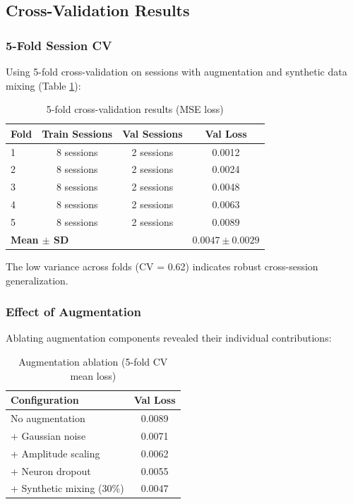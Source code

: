\documentclass[11pt,twocolumn]{article}
\begin{document}
\subsection{Cross-Validation Results}

\subsubsection{5-Fold Session CV}
Using 5-fold cross-validation on sessions with augmentation and synthetic data mixing (Table \ref{tab:cv_results}):

\begin{table}[htbp]
\centering
\caption{5-fold cross-validation results (MSE loss)}
\label{tab:cv_results}
\begin{tabular}{lccc}
\toprule
\textbf{Fold} & \textbf{Train Sessions} & \textbf{Val Sessions} & \textbf{Val Loss} \\
\midrule
1 & 8 sessions & 2 sessions & 0.0012 \\
2 & 8 sessions & 2 sessions & 0.0024 \\
3 & 8 sessions & 2 sessions & 0.0048 \\
4 & 8 sessions & 2 sessions & 0.0063 \\
5 & 8 sessions & 2 sessions & 0.0089 \\
\midrule
\multicolumn{3}{l}{\textbf{Mean $\pm$ SD}} & $\mathbf{0.0047 \pm 0.0029}$ \\
\bottomrule
\end{tabular}
\end{table}

The low variance across folds (CV = 0.62) indicates robust cross-session generalization.

\subsubsection{Effect of Augmentation}
Ablating augmentation components revealed their individual contributions:

\begin{table}[htbp]
\centering
\caption{Augmentation ablation (5-fold CV mean loss)}
\label{tab:aug_ablation}
\begin{tabular}{lc}
\toprule
\textbf{Configuration} & \textbf{Val Loss} \\
\midrule
No augmentation & 0.0089 \\
+ Gaussian noise & 0.0071 \\
+ Amplitude scaling & 0.0062 \\
+ Neuron dropout & 0.0055 \\
+ Synthetic mixing (30\%) & $\mathbf{0.0047}$ \\
\bottomrule
\end{tabular}
\end{table}
\end{document}
